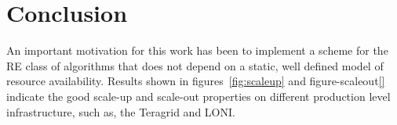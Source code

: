 \documentclass{rspublic}
\newcommand{\alnote}[1]{ {\textcolor{blue} { ***andre: #1 }}}
\newcommand{\athotanote}[1]{ {\textcolor{green} { ***athota: #1 }}}
\newcommand{\alnote}[1]{}
\newcommand{\athotanote}[1]{}
\begin{document}

\section{Conclusion}
\label{sec:conclusion}







An important motivation for this work has been to implement a scheme for the RE class of algorithms that does not depend on a static, well defined model of resource availability. %
Results shown in figures~\ref{fig:scaleup} and figure-scaleout\ref{} indicate the good scale-up and scale-out properties on different production level infrastructure, such as, the Teragrid and LONI.
\end{document}
